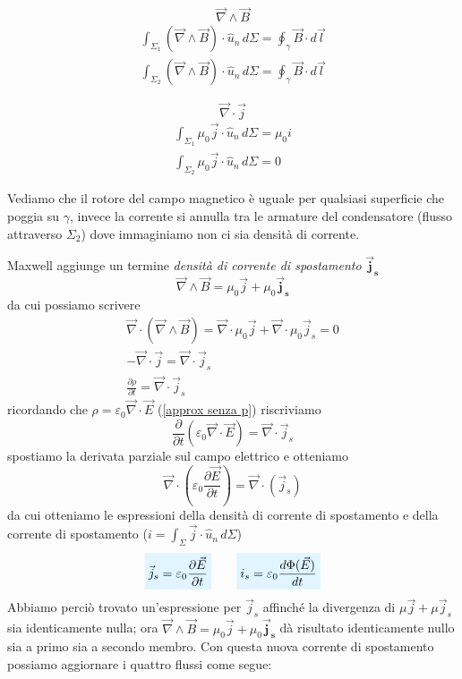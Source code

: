 \documentclass[x11names]{report}
\newcommand{\viola}[1]{%
	\colorbox{myblue}{$\displaystyle #1$}
}
\begin{document}
\begin{minipage}{0.5\textwidth}
	\[
	\boxed{\vec{\nabla}\wedge \vec{B}}
	\]
	\begin{gather*}
		\int_{\Sigma_1}\left(\vec{\nabla}\wedge \vec{B}\right)\cdot \hat{u}_n \, d\Sigma = \oint_\gamma \vec{B} \cdot d\vec{l} \\
		\int_{\Sigma_2}\left(\vec{\nabla}\wedge \vec{B}\right)\cdot \hat{u}_n \, d\Sigma = \oint_\gamma \vec{B} \cdot d\vec{l}
	\end{gather*}
\end{minipage}
\begin{minipage}{0.5\textwidth}
	\[
	\boxed{\vec{\nabla}\cdot \vec{j}}
	\]
	\begin{gather*}
		\int_{\Sigma_1} \mu_0 \vec{j} \cdot \hat{u}_n \, d\Sigma = \mu_0 i \\
		\int_{\Sigma_2} \mu_0 \vec{j} \cdot \hat{u}_n \, d\Sigma = 0
	\end{gather*}
\end{minipage}\vspace{0.8cm}
Vediamo che il rotore del campo magnetico è uguale per qualsiasi superficie che poggia su \(\gamma\), invece la corrente si annulla tra le armature del condensatore (flusso attraverso \(\Sigma_2\)) dove immaginiamo non ci sia densità di corrente. 

Maxwell aggiunge un termine \textit{densità di corrente di spostamento} \(\boldsymbol{\vec{j}_s}\)
\[
\vec{\nabla}\wedge \vec{B} = \mu_0 \vec{j} + \mu_0 \boldsymbol{\vec{j}_s}
\]
da cui possiamo scrivere
\begin{gather*}
	\vec{\nabla}\cdot\left(\vec{\nabla}\wedge \vec{B}\right) = \vec{\nabla}\cdot\mu_0 \vec{j} + \vec{\nabla}\cdot\mu_0 \vec{j}_s = 0 \\
	-\vec{\nabla}\cdot\vec{j} = \vec{\nabla}\cdot\vec{j}_s \\
	\frac{\partial \rho}{\partial t} = \vec{\nabla}\cdot\vec{j}_s
\end{gather*}
ricordando che \(\rho = \varepsilon_0\vec{\nabla}\cdot\vec{E}\) (\ref{approx senza p}) riscriviamo
\[
\frac{\partial}{\partial t}\left(\varepsilon_0\vec{\nabla}\cdot\vec{E}\right)=\vec{\nabla}\cdot\vec{j}_s
\]
spostiamo la derivata parziale sul campo elettrico e otteniamo
\[
\vec{\nabla}\cdot\left(\varepsilon_0\frac{\partial\vec{E}}{\partial t}\right) = \vec{\nabla}\cdot\left(\vec{j}_s\right) 
\]
da cui otteniamo le espressioni della densità di corrente di spostamento e della corrente di spostamento (\(i = \int_\Sigma \vec{j}\cdot\hat{u}_n \, d\Sigma\))
\begin{equation}
	\viola{\vec{j}_s = \varepsilon_0\frac{\partial\vec{E}}{\partial t}} \qquad \viola{i_s = \varepsilon_0\frac{d\Phi(\vec{E})}{dt}}
\end{equation}
Abbiamo perciò trovato un'espressione per \(\vec{j}_s\) affinché la divergenza di \(\mu\vec{j}+\mu\vec{j}_s\) sia identicamente nulla; ora \(\vec{\nabla}\wedge \vec{B} = \mu_0 \vec{j} + \mu_0 \boldsymbol{\vec{j}_s}\) dà risultato identicamente nullo sia a primo sia a secondo membro.
Con questa nuova corrente di spostamento possiamo aggiornare i quattro flussi come segue:
\end{document}
